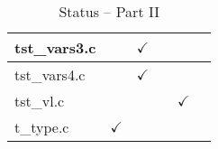 \begin{table}[H]
\begin{tabular}{|l|c|c|c|c|c|}
tst\_vars3.c            &               & $\checkmark$  &               &               &               \\ \hline
tst\_vars4.c            &               & $\checkmark$  &               &               &               \\ \hline
tst\_vl.c               &               &               &               & $\checkmark$  &               \\ \hline
t\_type.c               & $\checkmark$  &               &               &               &               \\ \hline
\hline
\end{tabular}
\caption{\label{tab:nc_test4_status_2} Status -- Part II}
\end{table}
